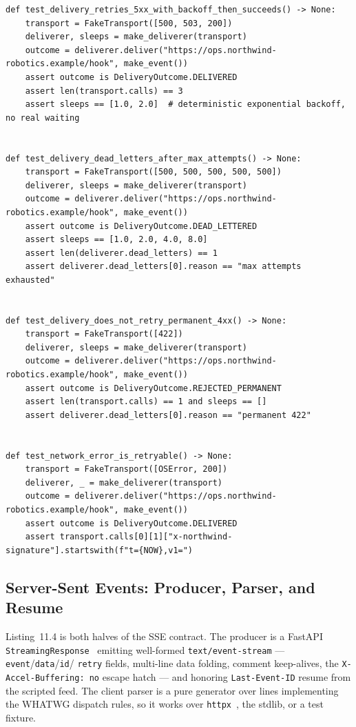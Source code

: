 \begin{verbatim}
def test_delivery_retries_5xx_with_backoff_then_succeeds() -> None:
    transport = FakeTransport([500, 503, 200])
    deliverer, sleeps = make_deliverer(transport)
    outcome = deliverer.deliver("https://ops.northwind-robotics.example/hook", make_event())
    assert outcome is DeliveryOutcome.DELIVERED
    assert len(transport.calls) == 3
    assert sleeps == [1.0, 2.0]  # deterministic exponential backoff, no real waiting


def test_delivery_dead_letters_after_max_attempts() -> None:
    transport = FakeTransport([500, 500, 500, 500, 500])
    deliverer, sleeps = make_deliverer(transport)
    outcome = deliverer.deliver("https://ops.northwind-robotics.example/hook", make_event())
    assert outcome is DeliveryOutcome.DEAD_LETTERED
    assert sleeps == [1.0, 2.0, 4.0, 8.0]
    assert len(deliverer.dead_letters) == 1
    assert deliverer.dead_letters[0].reason == "max attempts exhausted"


def test_delivery_does_not_retry_permanent_4xx() -> None:
    transport = FakeTransport([422])
    deliverer, sleeps = make_deliverer(transport)
    outcome = deliverer.deliver("https://ops.northwind-robotics.example/hook", make_event())
    assert outcome is DeliveryOutcome.REJECTED_PERMANENT
    assert len(transport.calls) == 1 and sleeps == []
    assert deliverer.dead_letters[0].reason == "permanent 422"


def test_network_error_is_retryable() -> None:
    transport = FakeTransport([OSError, 200])
    deliverer, _ = make_deliverer(transport)
    outcome = deliverer.deliver("https://ops.northwind-robotics.example/hook", make_event())
    assert outcome is DeliveryOutcome.DELIVERED
    assert transport.calls[0][1]["x-northwind-signature"].startswith(f"t={NOW},v1=")
\end{verbatim}

\subsection{Server-Sent Events: Producer, Parser, and Resume}
\label{sec:ch11-code-sse}

Listing~11.4 is both halves of the SSE contract. The producer is a FastAPI
\texttt{StreamingResponse}~\cite{fastapidocs} emitting well-formed
\texttt{text/event-stream} --- \texttt{event}/\texttt{data}/\texttt{id}/
\texttt{retry} fields, multi-line data folding, comment keep-alives, the
\texttt{X-Accel-Buffering: no} escape hatch --- and honoring
\texttt{Last-Event-ID} resume from the scripted feed. The client parser is a
pure generator over lines implementing the WHATWG dispatch rules, so it works
over \texttt{httpx}~\cite{httpxdocs}, the stdlib, or a test fixture.

